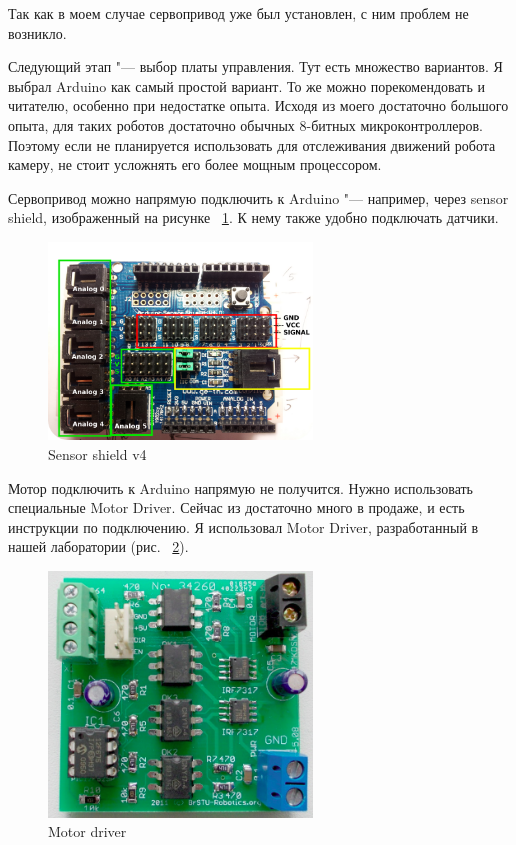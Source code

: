 \documentclass[10pt, a5paper]{article}
\begin{document}
Так как в моем случае сервопривод уже был установлен, с ним проблем не возникло.

Следующий этап "--- выбор платы управления. Тут есть множество вариантов. Я выбрал Arduino как самый простой вариант. То же можно порекомендовать и читателю, особенно при недостатке опыта. Исходя из моего достаточно большого опыта, для таких роботов достаточно обычных 8-битных микроконтроллеров. Поэтому если не планируется использовать для отслеживания движений робота камеру, не стоит усложнять его более мощным процессором.

Сервопривод можно напрямую подключить к Arduino "--- например, через sensor shield, изображенный на рисунке ~\ref{Sklipus3}. К нему также удобно подключать датчики.

\begin{figure}[h!]
  \centering
  \includegraphics[width=7cm]{w_09_2016_Sklipus3.png}
  \caption {Sensor shield v4}\label{Sklipus3}
\end{figure}


Мотор подключить к Arduino напрямую не получится. Нужно использовать специальные Motor Driver. Сейчас из достаточно много в продаже, и есть инструкции по подключению. Я использовал Motor Driver, разработанный в нашей лаборатории (рис. ~\ref{Sklipus4}).

\begin{figure}[h!]
  \centering
  \includegraphics[width=7cm]{w_09_2016_Sklipus4.png}
  \caption {Motor driver}\label{Sklipus4}
\end{figure}
\end{document}
